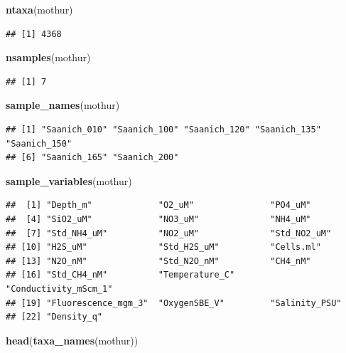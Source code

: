 \documentclass[11 pt,]{article}
\newenvironment{Shaded}{\begin{snugshade}}{\end{snugshade}}
\newcommand{\KeywordTok}[1]{\textcolor[rgb]{0.13,0.29,0.53}{\textbf{#1}}}
\newcommand{\NormalTok}[1]{#1}
\begin{document}
\begin{Shaded}
\begin{Highlighting}[]
\KeywordTok{ntaxa}\NormalTok{(mothur)}
\end{Highlighting}
\end{Shaded}

\begin{verbatim}
## [1] 4368
\end{verbatim}

\begin{Shaded}
\begin{Highlighting}[]
\KeywordTok{nsamples}\NormalTok{(mothur)}
\end{Highlighting}
\end{Shaded}

\begin{verbatim}
## [1] 7
\end{verbatim}

\begin{Shaded}
\begin{Highlighting}[]
\KeywordTok{sample_names}\NormalTok{(mothur)}
\end{Highlighting}
\end{Shaded}

\begin{verbatim}
## [1] "Saanich_010" "Saanich_100" "Saanich_120" "Saanich_135" "Saanich_150"
## [6] "Saanich_165" "Saanich_200"
\end{verbatim}

\begin{Shaded}
\begin{Highlighting}[]
\KeywordTok{sample_variables}\NormalTok{(mothur)}
\end{Highlighting}
\end{Shaded}

\begin{verbatim}
##  [1] "Depth_m"             "O2_uM"               "PO4_uM"             
##  [4] "SiO2_uM"             "NO3_uM"              "NH4_uM"             
##  [7] "Std_NH4_uM"          "NO2_uM"              "Std_NO2_uM"         
## [10] "H2S_uM"              "Std_H2S_uM"          "Cells.ml"           
## [13] "N2O_nM"              "Std_N2O_nM"          "CH4_nM"             
## [16] "Std_CH4_nM"          "Temperature_C"       "Conductivity_mScm_1"
## [19] "Fluorescence_mgm_3"  "OxygenSBE_V"         "Salinity_PSU"       
## [22] "Density_q"
\end{verbatim}

\begin{Shaded}
\begin{Highlighting}[]
\KeywordTok{head}\NormalTok{(}\KeywordTok{taxa_names}\NormalTok{(mothur))}
\end{Highlighting}
\end{Shaded}
\end{document}
